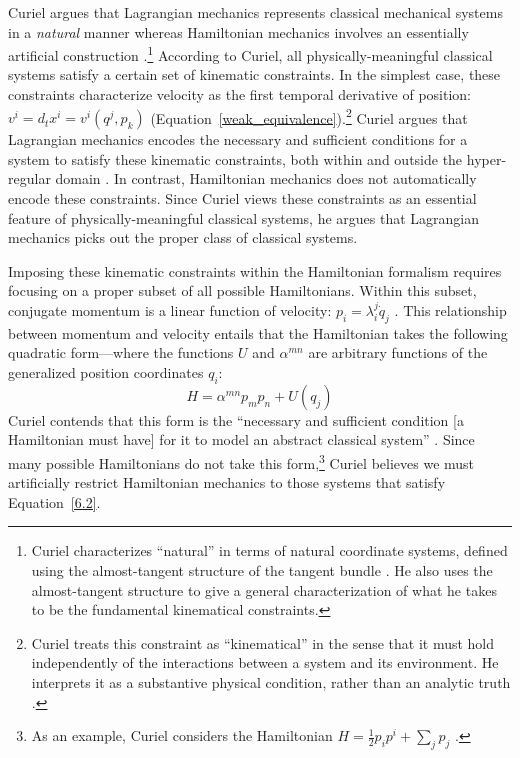 \documentclass[12pt, english, twoside]{article} %
\begin{document}

Curiel argues that Lagrangian mechanics represents classical mechanical systems in a \textit{natural} manner whereas Hamiltonian mechanics involves an essentially artificial construction \parencites*[270]{Curiel}.\footnote{Curiel characterizes ``natural'' in terms of natural coordinate systems, defined using the almost-tangent structure of the tangent bundle \parencites*[290-291]{Curiel}. He also uses the almost-tangent structure to give a general characterization of what he takes to be the fundamental kinematical constraints.} According to Curiel, all physically-meaningful classical systems satisfy a certain set of kinematic constraints. In the simplest case, these constraints characterize velocity as the first temporal derivative of position: $v^i = d_t x^i = v^i(q^j, p_k)$ (Equation~\ref{weak_equivalence}).\footnote{Curiel treats this constraint as ``kinematical'' in the sense that it must hold independently of the interactions between a system and its environment. He interprets it as a substantive physical condition, rather than an analytic truth \parencites*[282]{Curiel}.} Curiel argues that Lagrangian mechanics encodes the necessary and sufficient conditions for a system to satisfy these kinematic constraints, both within and outside the hyper-regular domain \parencites*[307--308, 311]{Curiel}. In contrast, Hamiltonian mechanics does not automatically encode these constraints. Since Curiel views these constraints as an essential feature of physically-meaningful classical systems, he argues that Lagrangian mechanics picks out the proper class of classical systems. 

Imposing these kinematic constraints within the Hamiltonian formalism requires focusing on a proper subset of all possible Hamiltonians. Within this subset, conjugate momentum is a linear function of velocity: $p_i = \lambda^j_i \dot{q}_j $ \parencites*[304]{Curiel}. This relationship between momentum and velocity entails that the Hamiltonian takes the following quadratic form---where the functions $U$ and $\alpha^{m n}$ are arbitrary functions of the generalized position coordinates $q_i$:
\begin{equation} \label{6.2}
H =\alpha^{m n} p_m p_n + U (q_j) 
\end{equation}
Curiel contends that this form is the ``necessary and sufficient condition [a Hamiltonian must have] for it to model an abstract classical system'' \parencites*[305]{Curiel}. Since many possible Hamiltonians do not take this form,\footnote{As an example, Curiel considers the Hamiltonian $H = \frac{1}{2} p_i p^i + \sum_j p_j$  \parencites*[305]{Curiel}.} Curiel believes we must artificially restrict Hamiltonian mechanics to those systems that satisfy Equation~\ref{6.2}.
\end{document}
